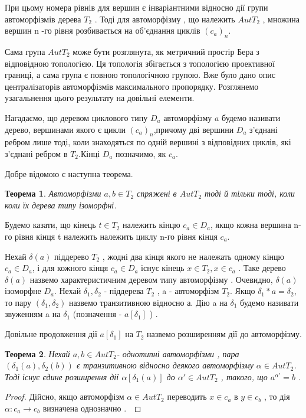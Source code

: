 \documentclass[a4paper,12pt]{article} \usepackage{a4wide}
\numberwithin{equation}{subsection}
\newtheorem{theorem}{Теорема}[subsection]
\begin{document}
При цьому номера рівнів для  вершин  є інваріантними відносно дії групи автоморфізмів дерева $T_2$   .
Тоді для автоморфізму  , що належить $AutT_2$ , множина вершин   n -го рівня розбивається на об'єднання циклів $(c_a)_n$.

Сама група $AutT_2$ може бути розглянута, як метричний простір Бера з відповідною топологією. Ця топологія збігається з топологією проективної границі, а сама група   є повною топологічною групою.
Вже було дано опис централізаторів автоморфізмів максимального пропорядку.
Розглянемо узагальнення цього результату на довільні елементи.

Нагадаємо, що деревом циклового типу $D_a$ автоморфізму $a$ будемо називати дерево,
 вершинами якого є цикли $(c_a)_n$,причому дві вершини $D_a$ з'єднані ребром лише тоді,
  коли знаходяться по одній вершині з відповідних циклів, які з'єднані ребром в $T_2$.Кінці $D_a$ позначимо, як $c_a$.

  Добре відомою є наступна теорема.
  \begin{theorem}
   Автоморфізми $a,b\in T_2$ спряжені в $AutT_2$ тоді й тільки тоді, коли  коли їх дерева типу ізоморфні.
    \end{theorem}
    Будемо казати, що кінець $t\in T_2$ належить кінцю $c_a \in D_a$, якщо кожна вершина n-го рівня кінця t
    належить належить циклу n-го рівня кінця $c_a$.

     Нехай  $\delta (a)$ піддерево  $T_2$ , жодні два кінця якого не належать одному кінцю $c_a \in D_a$,
      і для кожного кінця  $c_a \in D_a$  існує кінець $x\in T_2,x\in c_a$   . Таке дерево  $\delta (a)$ назвемо характеристичним деревом типу автоморфізму  . Очевидно, $\delta (a)$  ізоморфне $D_a$.
 Нехай  $\delta _1,\delta _2$  - піддерева $T_2$ , a - автоморфізм  $T_2$.
  Якщо  $\delta _1\ast a=\delta _2$, то пару $(\delta _1,\delta _2)$   назвемо транзитивною відносно а. Дію  a на $\delta _1$  будемо називати звуженням  a  на   $\delta _1$ (позначення - $a [ \delta _1]$ ) .

 Довільне продовження дії $a [ \delta _1]$  на  $T_2$ назвемо розширенням дії до автоморфізму.
\begin{theorem} \label{caut}
 Нехай  $a,b\in AutT_2$- однотипні автоморфізми ,
  пара $(\delta _1(a),\delta _2(b))$ є транзитивною відносно деякого автоморфізму $\alpha \in AutT_2$. Тоді існує єдине розширення дії $\alpha [ \delta _1(a)]$
  до  $\alpha ' \in AutT_2$ , такого, що $a^{\alpha '} =b$ .
    \end{theorem}
\begin{proof}

 Дійсно, якщо автоморфізм $\alpha \in AutT_2$  переводить
  $x\in c_a$  в  $y\in c_b$ , то дія  $\alpha :c_a\rightarrow c_b$ визначена однозначно .\
    \end{proof}
\end{document}
